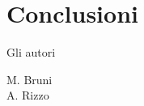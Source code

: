 \section{Conclusioni}

\singlespacing
\begin{flushright}
Gli autori
\vspace{0.5cm}

M. Bruni \\
A. Rizzo
\end{flushright}

\doublespacing